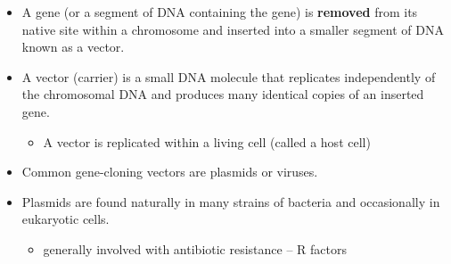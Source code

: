 \documentclass[
  ignorenonframetext,
  aspectratio=169]{beamer}
\providecommand{\tightlist}{%
  \setlength{\itemsep}{0pt}\setlength{\parskip}{0pt}}
\begin{document}
\begin{frame}{}
\protect\hypertarget{section-2}{}
\begin{itemize}
\tightlist
\item
  A gene (or a segment of DNA containing the gene) is \textbf{removed}
  from its native site within a chromosome and inserted into a smaller
  segment of DNA known as a vector.
\item
  A vector (carrier) is a small DNA molecule that replicates
  independently of the chromosomal DNA and produces many identical
  copies of an inserted gene.

  \begin{itemize}
  \tightlist
  \item
    A vector is replicated within a living cell (called a host cell)
  \end{itemize}
\item
  Common gene-cloning vectors are plasmids or viruses.
\item
  Plasmids are found naturally in many strains of bacteria and
  occasionally in eukaryotic cells.

  \begin{itemize}
  \tightlist
  \item
    generally involved with antibiotic resistance -- R factors
  \end{itemize}
\end{itemize}
\end{frame}
\end{document}

